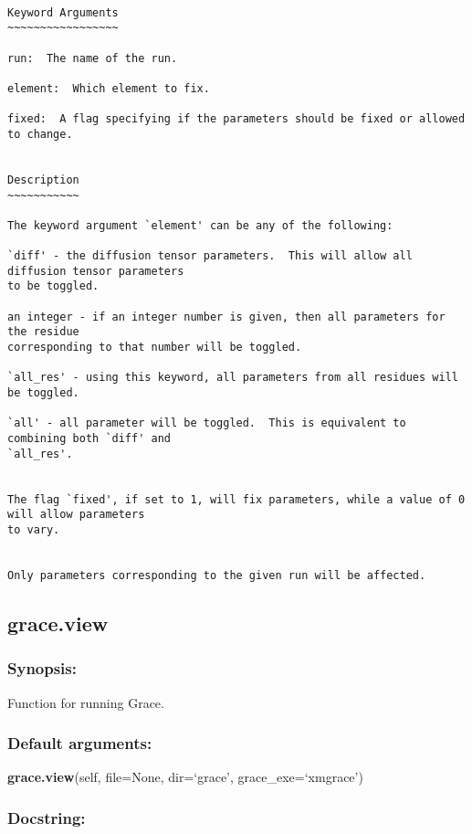 {\scriptsize
\begin{verbatim}

Keyword Arguments
~~~~~~~~~~~~~~~~~

run:  The name of the run.

element:  Which element to fix.

fixed:  A flag specifying if the parameters should be fixed or allowed to change.


Description
~~~~~~~~~~~

The keyword argument `element' can be any of the following:

`diff' - the diffusion tensor parameters.  This will allow all diffusion tensor parameters
to be toggled.

an integer - if an integer number is given, then all parameters for the residue
corresponding to that number will be toggled.

`all_res' - using this keyword, all parameters from all residues will be toggled.

`all' - all parameter will be toggled.  This is equivalent to combining both `diff' and
`all_res'.


The flag `fixed', if set to 1, will fix parameters, while a value of 0 will allow parameters
to vary.


Only parameters corresponding to the given run will be affected.
\end{verbatim}
}



\newpage

\subsection{grace.view}


\subsubsection{Synopsis:}

Function for running Grace.

\subsubsection{Default arguments:}

\textsf{\textbf{grace.view}(self, file=None, dir=`grace', grace\_exe=`xmgrace')
}


\subsubsection{Docstring:}

